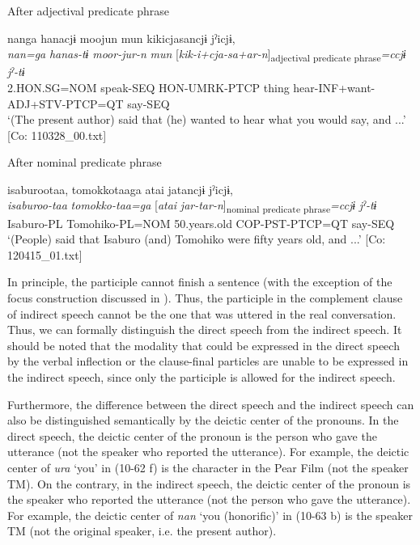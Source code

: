 \begin{xlist}
\begin{xlist}
  \exi{} After adjectival predicate phrase

  \ex{}%
      \glll    nanga  hanacjɨ  moojun  mun  kikicjasancjɨ  jˀicjɨ,\\
      \textit{nan=ga}  \textit{hanas-tɨ}  \textit{moor-jur-n}  \textit{mun}   [\textit{kik-i+cja-sa+ar-n}]\textsubscript{adjectival predicate phrase}\textit{=ccjɨ}  \textit{jˀ{}-tɨ}\\
      2.HON.SG=NOM  speak-SEQ  HON-UMRK-PTCP  thing  hear-INF+want-ADJ+STV-PTCP=QT  say-SEQ\\
      \glt       ‘(The present author) said that (he) wanted to hear what you would say, and ...’ [Co: 110328\_00.txt]

  \exi{} After nominal predicate phrase

  \ex  %
      \glll    isaburootaa,  tomokkotaaga  atai  jatancjɨ  jˀicjɨ,\\
      \textit{isaburoo-taa}  \textit{tomokko-taa=ga}  [\textit{atai}  \textit{jar-tar-n}]\textsubscript{nominal predicate phrase}\textit{=ccjɨ} \textit{jˀ{}-tɨ}\\
      Isaburo-PL  Tomohiko-PL=NOM  50.years.old  COP-PST-PTCP=QT   say-SEQ\\
      \glt       ‘(People) said that Isaburo (and) Tomohiko were fifty years old, and ...’ [Co: 120415\_01.txt]
    \end{xlist}
\z

In principle, the participle cannot finish a sentence (with the exception of the focus construction discussed in ). Thus, the participle in the complement clause of indirect speech cannot be the one that was uttered in the real conversation. Thus, we can formally distinguish the direct speech from the indirect speech. It should be noted that the modality that could be expressed in the direct speech by the verbal inflection or the clause-final particles are unable to be expressed in the indirect speech, since only the participle is allowed for the indirect speech.

  Furthermore, the difference between the direct speech and the indirect speech can also be distinguished semantically by the deictic center of the pronouns. In the direct speech, the deictic center of the pronoun is the person who gave the utterance (not the speaker who reported the utterance). For example, the deictic center of \textit{ura} ‘you’ in (10-62 f) is the character in the Pear Film (not the speaker TM). On the contrary, in the indirect speech, the deictic center of the pronoun is the speaker who reported the utterance (not the person who gave the utterance). For example, the deictic center of \textit{nan} ‘you (honorific)’ in (10-63 b) is the speaker TM (not the original speaker, i.e. the present author).


\end{xlist}
